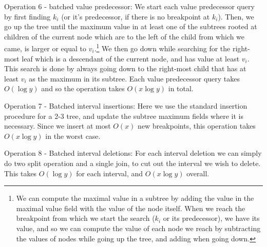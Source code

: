 \documentclass[11pt,a4paper]{article}
\theoremstyle{definition}
\theoremstyle{remark}
\begin{document}
Operation 6 - batched value predecessor: We start each value predecessor query by first finding $k_i$ (or it's predecessor, if there is no breakpoint at $k_i$). Then, we go up the tree until the maximum value in at least one of the subtrees rooted at children of the current node which are to the left of the child from which we came, is larger or equal to $v_i$.\footnote{We can compute the maximal value in a subtree by adding the value in the maximal value field with the value of the node itself. When we reach the breakpoint from which we start the search ($k_i$ or its predecessor), we have its value, and so we can compute the value of each node we reach by subtracting the values of nodes while going up the tree, and adding when going down.} We then go down while searching for the right-most leaf which is a descendant of the current node, and has value at least $v_i$. This search is done by always going down to the right-most child that has at least $v_i$ as the maximum in its subtree. Each value predecessor query takes $O(\log y)$ and so the operation takes $O(x \log y)$ in total.

Operation 7 - Batched interval insertions: Here we use the standard insertion procedure for a 2-3 tree, and update the subtree maximum fields where it is necessary. Since we insert at most $O(x)$ new breakpoints, this operation takes $O(x \log y)$ in the worst case.

Operation 8 - Batched interval deletions: For each interval deletion we can simply do two split operation and a single join, to cut out the interval we wish to delete. This takes $O(\log y)$ for each interval, and $O(x \log y)$ overall.

\end{document}
